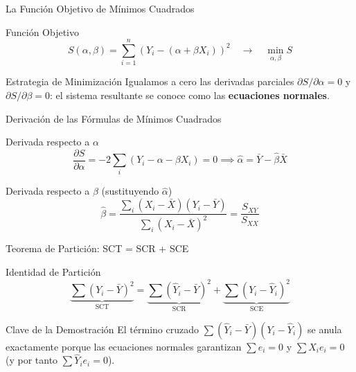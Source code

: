 \documentclass[10pt, aspectratio=169]{beamer}
\begin{document}
\begin{frame}{La Función Objetivo de Mínimos Cuadrados}
  \footnotesize
  \begin{block}{Función Objetivo}
    $$S(\alpha,\beta) = \sum_{i=1}^n\left(Y_i-(\alpha+\beta X_i)\right)^2 \quad \longrightarrow \quad \min_{\alpha,\beta} S$$
  \end{block}
  \pause

  \vspace{0.1cm}
  \begin{alertblock}{Estrategia de Minimización}
    Igualamos a cero las derivadas parciales $\partial S/\partial\alpha=0$ y $\partial S/\partial\beta=0$: el sistema resultante se conoce como las \textbf{ecuaciones normales}.
  \end{alertblock}
\end{frame}

\begin{frame}{Derivación de las Fórmulas de Mínimos Cuadrados}
  \footnotesize
  \begin{block}{Derivada respecto a $\alpha$}
    $$\frac{\partial S}{\partial\alpha}=-2\sum_i(Y_i-\alpha-\beta X_i)=0 \implies \hat\alpha=\bar Y-\hat\beta\bar X$$
  \end{block}
  \pause

  \vspace{0.1cm}
  \begin{alertblock}{Derivada respecto a $\beta$ (sustituyendo $\hat\alpha$)}
    $$\hat\beta=\frac{\sum_i(X_i-\bar X)(Y_i-\bar Y)}{\sum_i(X_i-\bar X)^2}=\frac{S_{XY}}{S_{XX}}$$
  \end{alertblock}
\end{frame}

\begin{frame}{Teorema de Partición: SCT = SCR + SCE}
  \footnotesize
  \begin{block}{Identidad de Partición}
    $$\underbrace{\sum(Y_i-\bar Y)^2}_{\text{SCT}} = \underbrace{\sum(\hat Y_i-\bar Y)^2}_{\text{SCR}} + \underbrace{\sum(Y_i-\hat Y_i)^2}_{\text{SCE}}$$
  \end{block}
  \pause

  \vspace{0.1cm}
  \begin{alertblock}{Clave de la Demostración}
    El término cruzado $\sum(\hat Y_i-\bar Y)(Y_i-\hat Y_i)$ se anula exactamente porque las ecuaciones normales garantizan $\sum e_i=0$ y $\sum X_ie_i=0$ (y por tanto $\sum\hat Y_ie_i=0$).
  \end{alertblock}
\end{frame}
\end{document}
